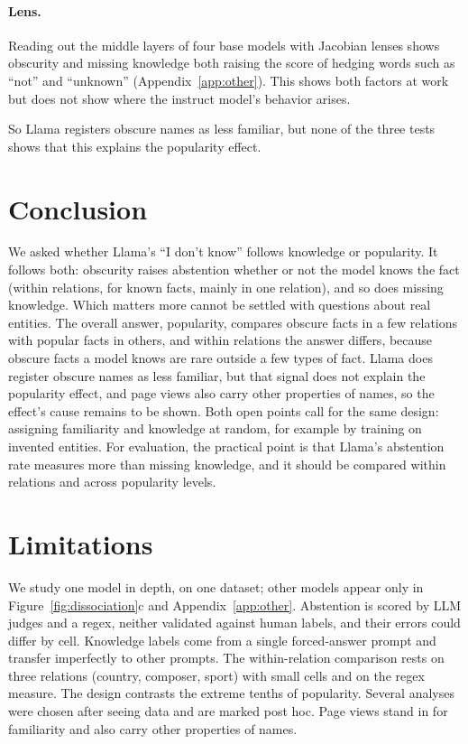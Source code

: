 \documentclass[11pt]{article}
\newcommand{\idk}{``I don't know''}
\begin{document}
\paragraph{Lens.} Reading out the middle layers of four base models with Jacobian lenses \citep{gurnee2026workspace} shows obscurity and missing knowledge both raising the score of hedging words such as ``not'' and ``unknown'' (Appendix~\ref{app:other}). This shows both factors at work but does not show where the instruct model's behavior arises.

So Llama registers obscure names as less familiar, but none of the three tests shows that this explains the popularity effect.

\section{Conclusion}

We asked whether Llama's \idk{} follows knowledge or popularity. It follows both: obscurity raises abstention whether or not the model knows the fact (within relations, for known facts, mainly in one relation), and so does missing knowledge. Which matters more cannot be settled with questions about real entities. The overall answer, popularity, compares obscure facts in a few relations with popular facts in others, and within relations the answer differs, because obscure facts a model knows are rare outside a few types of fact. Llama does register obscure names as less familiar, but that signal does not explain the popularity effect, and page views also carry other properties of names, so the effect's cause remains to be shown. Both open points call for the same design: assigning familiarity and knowledge at random, for example by training on invented entities. For evaluation, the practical point is that Llama's abstention rate measures more than missing knowledge, and it should be compared within relations and across popularity levels.

\section*{Limitations}

We study one model in depth, on one dataset; other models appear only in Figure~\ref{fig:dissociation}c and Appendix~\ref{app:other}. Abstention is scored by LLM judges and a regex, neither validated against human labels, and their errors could differ by cell. Knowledge labels come from a single forced-answer prompt and transfer imperfectly to other prompts. The within-relation comparison rests on three relations (country, composer, sport) with small cells and on the regex measure. The design contrasts the extreme tenths of popularity. Several analyses were chosen after seeing data and are marked post hoc. Page views stand in for familiarity and also carry other properties of names.
\end{document}
